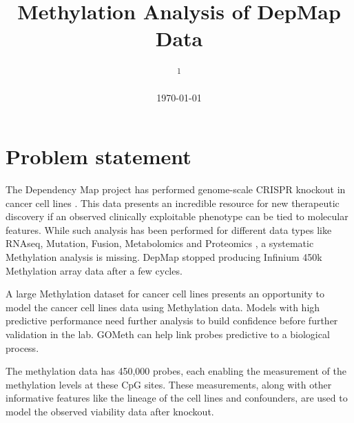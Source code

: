 \documentclass[10pt, a4paper, twocolumn]{article} %
\title{Methylation Analysis of DepMap Data} %
\author{
	\authorstyle{Ashir Borah\textsuperscript{1}} %
	\newline\newline %
	\textsuperscript{1}\institution{BMI PhD Program, University of California, San Francisco}\\ %
}
\date{\today} %
\begin{document}
\maketitle %

\thispagestyle{firstpage} %




\section{Problem statement}

The Dependency Map project has performed genome-scale CRISPR knockout in cancer cell lines \citep{Tsherniak2017-mc}. This data presents an incredible resource for new therapeutic discovery if an observed clinically exploitable phenotype can be tied to molecular features. While such analysis has been performed for different data types like RNAseq, Mutation, Fusion, Metabolomics and Proteomics \citep{Dempster2020.02.21.959627}, a systematic Methylation analysis is missing. DepMap stopped producing Infinium 450k Methylation array data after a few cycles. 

A large Methylation dataset for cancer cell lines \citep{Iorio2016-mq} presents an opportunity to model the cancer cell lines data using Methylation data. Models with high predictive performance need further analysis to build confidence before further validation in the lab. GOMeth \citep{Maksimovic2021} can help link probes predictive to a biological process.

The methylation data has 450,000 probes, each enabling the measurement of the methylation levels at these CpG sites. These measurements, along with other informative features like the lineage of the cell lines and confounders, are used to model the observed viability data after knockout.
\end{document}
